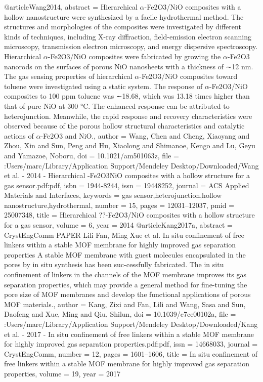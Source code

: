 @article{Wang2014,
abstract = {Hierarchical $\alpha$-Fe2O3/NiO composites with a hollow nanostructure were synthesized by a facile hydrothermal method. The structures and morphologies of the composites were investigated by different kinds of techniques, including X-ray diffraction, field-emission electron scanning microscopy, transmission electron microscopy, and energy dispersive spectroscopy. Hierarchical $\alpha$-Fe2O3/NiO composites were fabricated by growing the $\alpha$-Fe2O3 nanorods on the surfaces of porous NiO nanosheets with a thickness of ∼12 nm. The gas sensing properties of hierarchical $\alpha$-Fe2O3/NiO composites toward toluene were investigated using a static system. The response of $\alpha$-Fe2O3/NiO composites to 100 ppm toluene was ∼18.68, which was 13.18 times higher than that of pure NiO at 300 °C. The enhanced response can be attributed to heterojunction. Meanwhile, the rapid response and recovery characteristics were observed because of the porous hollow structural characteristics and catalytic actions of $\alpha$-Fe2O3 and NiO.},
author = {Wang, Chen and Cheng, Xiaoyang and Zhou, Xin and Sun, Peng and Hu, Xiaolong and Shimanoe, Kengo and Lu, Geyu and Yamazoe, Noboru},
doi = {10.1021/am501063z},
file = {:Users/marc/Library/Application Support/Mendeley Desktop/Downloaded/Wang et al. - 2014 - Hierarchical -Fe2O3NiO composites with a hollow structure for a gas sensor.pdf:pdf},
isbn = {1944-8244},
issn = {19448252},
journal = {ACS Applied Materials and Interfaces},
keywords = {gas sensor,heterojunction,hollow nanostructure,hydrothermal},
number = {15},
pages = {12031--12037},
pmid = {25007348},
title = {{Hierarchical ??-Fe2O3/NiO composites with a hollow structure for a gas sensor}},
volume = {6},
year = {2014}
}
@article{Kang2017a,
abstract = {CrystEngComm PAPER Lili Fan, Ming Xue et al. In situ confinement of free linkers within a stable MOF membrane for highly improved gas separation properties A stable MOF membrane with guest molecules encapsulated in the pores by in situ synthesis has been suc-cessfully fabricated. The in situ confinement of linkers in the channels of the MOF membrane improves its gas separation properties, which may provide a general method for fine-tuning the pore size of MOF membranes and develop the functional applications of porous MOF materials.},
author = {Kang, Zixi and Fan, Lili and Wang, Sasa and Sun, Daofeng and Xue, Ming and Qiu, Shilun},
doi = {10.1039/c7ce00102a},
file = {:Users/marc/Library/Application Support/Mendeley Desktop/Downloaded/Kang et al. - 2017 - In situ confinement of free linkers within a stable MOF membrane for highly improved gas separation properties.pdf:pdf},
issn = {14668033},
journal = {CrystEngComm},
number = {12},
pages = {1601--1606},
title = {{In situ confinement of free linkers within a stable MOF membrane for highly improved gas separation properties}},
volume = {19},
year = {2017}
}
